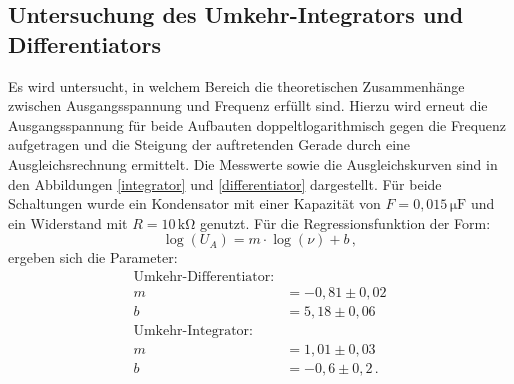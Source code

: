 \subsection{Untersuchung des Umkehr-Integrators und Differentiators}
Es wird untersucht, in welchem Bereich die theoretischen Zusammenhänge zwischen Ausgangsspannung und Frequenz erfüllt sind. Hierzu wird erneut die Ausgangsspannung für beide Aufbauten doppeltlogarithmisch gegen die Frequenz aufgetragen und die Steigung der auftretenden Gerade durch eine Ausgleichsrechnung ermittelt. Die Messwerte sowie die Ausgleichskurven sind in den Abbildungen \ref{integrator} und \ref{differentiator} dargestellt. Für beide Schaltungen wurde ein Kondensator mit einer Kapazität von $F=0{,}015\,\si{\micro\farad}$ und ein Widerstand mit $R=10\,\si{\kilo\ohm}$ genutzt. Für die Regressionsfunktion der Form:
\begin{equation}
\log(U_A)=m\cdot\log(\nu)+b\,,
\end{equation}
ergeben sich die Parameter:
\begin{align}
\text{Umkehr-Differentiator:}\nonumber\\
m&=-0{,}81\pm0{,}02\nonumber\\
b&=5{,}18\pm0{,}06\nonumber\\
\text{Umkehr-Integrator:}\nonumber\\
m&=1{,}01\pm0{,}03\nonumber\\
b&=-0{,}6\pm0{,}2\nonumber\,.\\
\end{align}

